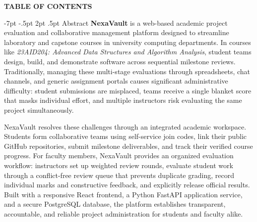 \documentclass[11pt,a4paper]{article}
\makeatletter
\renewcommand\section{\@startsection {section}{1}{\z@}%
  {-7pt \@plus -1.5pt \@minus -.5pt}%
  {2pt \@plus .5pt}%
  {\normalfont\large\bfseries\color{nexaNavy}}}
\makeatother
\begin{document}
\clearpage

\pagestyle{nexaTOC}
\setcounter{page}{2}

\begin{center}
  {\Large\bfseries\color{nexaNavy} TABLE OF CONTENTS}\par
\end{center}
\vspace{0.2cm}

\renewcommand{\contentsname}{}
\vspace{-1.0cm}
{
  \makeatletter
  \renewcommand{\@pnumwidth}{1.8em}
  \renewcommand{\@tocrmarg}{2.5em}
  \makeatother
  \tableofcontents
}

\clearpage

\pagestyle{nexaReport}
\setcounter{page}{3}

\section{Abstract}
\textbf{NexaVault} is a web-based academic project evaluation and collaborative management platform designed to streamline laboratory and capstone courses in university computing departments. In courses like \textit{23AID204: Advanced Data Structures and Algorithm Analysis}, student teams design, build, and demonstrate software across sequential milestone reviews. Traditionally, managing these multi-stage evaluations through spreadsheets, chat channels, and generic assignment portals causes significant administrative difficulty: student submissions are misplaced, teams receive a single blanket score that masks individual effort, and multiple instructors risk evaluating the same project simultaneously.

NexaVault resolves these challenges through an integrated academic workspace. Students form collaborative teams using self-service join codes, link their public GitHub repositories, submit milestone deliverables, and track their verified course progress. For faculty members, NexaVault provides an organized evaluation workflow: instructors set up weighted review rounds, evaluate student work through a conflict-free review queue that prevents duplicate grading, record individual marks and constructive feedback, and explicitly release official results. Built with a responsive React frontend, a Python FastAPI application service, and a secure PostgreSQL database, the platform establishes transparent, accountable, and reliable project administration for students and faculty alike.
\end{document}
